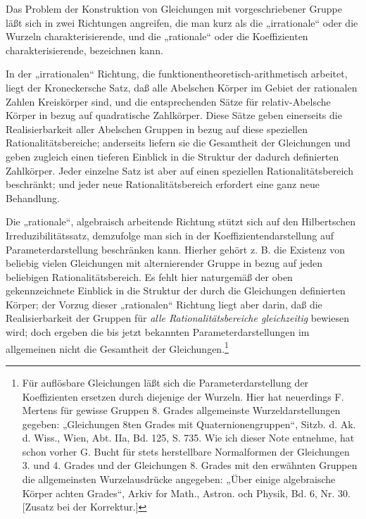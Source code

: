 \documentclass[11pt]{article}
\begin{document}
Das Problem der Konstruktion von Gleichungen mit vorgeschriebener Gruppe läßt sich in zwei Richtungen angreifen, die man kurz als die „irrationale“ oder die Wurzeln charakterisierende, und die „rationale“ oder die Koeffizienten charakterisierende, bezeichnen kann.

In der „irrationalen“ Richtung, die funktionentheoretisch-arithmetisch arbeitet, liegt der Kroneckersche Satz, daß alle Abelschen Körper im Gebiet der rationalen Zahlen Kreiskörper sind, und die entsprechenden Sätze für relativ-Abelsche Körper in bezug auf quadratische Zahlkörper. Diese Sätze geben einerseits die Realisierbarkeit aller Abelschen Gruppen in bezug auf diese speziellen Rationalitätsbereiche; anderseits liefern sie die Gesamtheit der Gleichungen und geben zugleich einen tieferen Einblick in die Struktur der dadurch definierten Zahlkörper. Jeder einzelne Satz ist aber auf einen speziellen Rationalitätsbereich beschränkt; und jeder neue Rationalitätsbereich erfordert eine ganz neue Behandlung.

Die „rationale“, algebraisch arbeitende Richtung stützt sich auf den Hilbertschen Irreduzibilitätssatz, demzufolge man sich in der Koeffizientendarstellung auf Parameterdarstellung beschränken kann. Hierher gehört z. B. die Existenz von beliebig vielen Gleichungen mit alternierender Gruppe in bezug auf jeden beliebigen Rationalitätsbereich. Es fehlt hier naturgemäß der oben gekennzeichnete Einblick in die Struktur der durch die Gleichungen definierten Körper; der Vorzug dieser „rationalen“ Richtung liegt aber darin, daß die Realisierbarkeit der Gruppen für \emph{alle Rationalitätsbereiche gleichzeitig} bewiesen wird; doch ergeben die bis jetzt bekannten Parameterdarstellungen im allgemeinen nicht die Gesamtheit der Gleichungen.\footnote{Für auflösbare Gleichungen läßt sich die Parameterdarstellung der Koeffizienten ersetzen durch diejenige der Wurzeln. Hier hat neuerdings F. Mertens für gewisse Gruppen 8. Grades allgemeinste Wurzeldarstellungen gegeben: „Gleichungen 8ten Grades mit Quaternionengruppen“, Sitzb. d. Ak. d. Wiss., Wien, Abt. IIa, Bd. 125, S. 735. Wie ich dieser Note entnehme, hat schon vorher G. Bucht für stets herstellbare Normalformen der Gleichungen 3. und 4. Grades und der Gleichungen 8. Grades mit den erwähnten Gruppen die allgemeinsten Wurzelausdrücke angegeben: „Über einige algebraische Körper achten Grades“, Arkiv for Math., Astron. och Physik, Bd. 6, Nr. 30. [Zusatz bei der Korrektur.]} 
\end{document}
